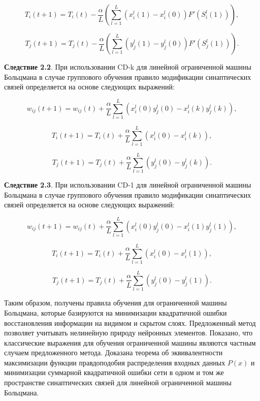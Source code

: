 \begin{equation*}
    T_i(t+1)=T_i(t)-\frac{\alpha}{L}\left(\sum_{l=1}^L (x_i^l(1)-x_i^l(0))F'(S_i^l(1))\right),
\end{equation*}

\begin{equation*}
    T_j(t+1)=T_j(t)-\frac{\alpha}{L}\left(\sum_{l=1}^L (y_j^l(1)-y_j^l(0))F'(S_j^l(1))\right).
\end{equation*}

\textbf{Следствие 2.2}. При использовании  CD-k для линейной ограниченной машины Больцмана в случае группового обучения правило модификации синаптических связей определяется на основе следующих выражений:

\begin{equation*}
    w_{ij}(t+1)=w_{ij}(t)+\frac{\alpha}{L}\sum_{l=1}^L (x_i^l(0)y_j^l(0)-x_i^l(k)y_j^l(k)),
\end{equation*}

\begin{equation*}
    T_{i}(t+1)=T_{i}(t)+\frac{\alpha}{L}\sum_{l=1}^L (x_i^l(0)-x_i^l(k)),
\end{equation*}

\begin{equation*}
    T_{j}(t+1)=T_{j}(t)+\frac{\alpha}{L}\sum_{l=1}^L (y_j^l(0)-y_j^l(k)).
\end{equation*}

\textbf{Следствие 2.3}. При использовании  CD-1 для линейной ограниченной машины Больцмана в случае группового обучения правило модификации синаптических связей определяется на основе следующих выражений:

\begin{equation*}
    w_{ij}(t+1)=w_{ij}(t)+\frac{\alpha}{L}\sum_{l=1}^L (x_i^l(0)y_j^l(0)-x_i^l(1)y_j^l(1)),
\end{equation*}

\begin{equation*}
    T_{i}(t+1)=T_{i}(t)+\frac{\alpha}{L}\sum_{l=1}^L (x_i^l(0)-x_i^l(1)),
\end{equation*}

\begin{equation*}
    T_{j}(t+1)=T_{j}(t)+\frac{\alpha}{L}\sum_{l=1}^L (y_j^l(0)-y_j^l(1)).
\end{equation*}

Таким образом, получены правила обучения для ограниченной машины Больцмана, которые базируются на минимизации квадратичной ошибки восстановления информации на видимом и скрытом слоях.  Предложенный метод позволяет учитывать нелинейную природу нейронных элементов. Показано, что классические выражения для обучения ограниченной машины являются частным случаем предложенного метода. Доказана теорема об эквивалентности максимизации функции правдоподобия распределения входных данных $P(x)$ и минимизации суммарной квадратичной ошибки сети в одном и том же пространстве синаптических связей для линейной ограниченной машины Больцмана. 

